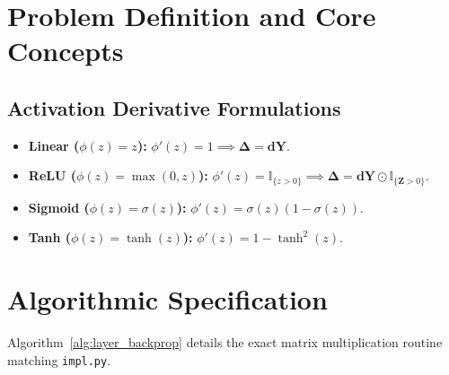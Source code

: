 \documentclass[11pt]{article}
\begin{document}
\section{Problem Definition and Core Concepts}
\label{sec:problem_definition}

\subsection{Activation Derivative Formulations}
\begin{itemize}
    \item \textbf{Linear ($\phi(z) = z$):} $\phi'(z) = 1 \implies \mathbf{\Delta} = \mathbf{dY}$.
    \item \textbf{ReLU ($\phi(z) = \max(0, z)$):} $\phi'(z) = \mathbb{I}_{\{z > 0\}} \implies \mathbf{\Delta} = \mathbf{dY} \odot \mathbb{I}_{\{\mathbf{Z} > 0\}}$.
    \item \textbf{Sigmoid ($\phi(z) = \sigma(z)$):} $\phi'(z) = \sigma(z)(1 - \sigma(z))$.
    \item \textbf{Tanh ($\phi(z) = \tanh(z)$):} $\phi'(z) = 1 - \tanh^2(z)$.
\end{itemize}

\section{Algorithmic Specification}
\label{sec:algorithm}

Algorithm~\ref{alg:layer_backprop} details the exact matrix multiplication routine matching \texttt{impl.py}.
\end{document}
